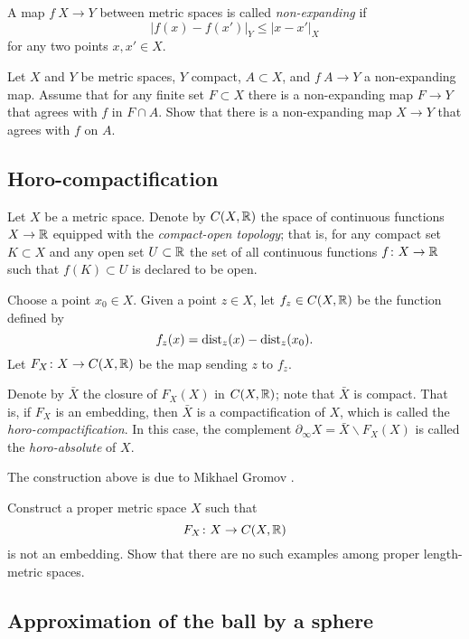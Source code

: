 A map $f\: X\to Y$ between metric spaces is called \emph{non-expanding} if
\[|f(x)-f(x')|_Y\le |x-x'|_X\]
for any two points $x,x'\in X$.

\begin{pr}
Let $X$ and $Y$ be metric spaces, 
$Y$ compact,
$A\subset X$,
and $f\:A\to Y$ a non-expanding map.
Assume that for any finite set $F\subset X$ there is a non-expanding map $F \to Y$
that agrees with $f$ in $F\cap A$.
Show that there is a non-expanding map $X\to  Y$ that agrees with $f$ on $A$.
\end{pr}


\subsection*{Horo-compactification\easy}
\label{Horocompactification}

Let $X$ be a metric space.
Denote by $C(X,\mathbb{R})$ the space of continuous functions $X\to \mathbb{R}$
equipped with the \emph{compact-open topology};
that is, for any compact set $K\subset X$ and any open set $U\subset \mathbb{R}$
the set of all continuous functions $f\colon X\to \mathbb{R}$ such that $f(K)\subset U$
is declared to be open.

Choose a point $x_0\in X$.
Given a point $z\in X$, let $f_z\in C(X,\mathbb{R})$ be the function defined by 
\[f_z(x)=\operatorname{\rm dist}\nolimits_z(x)-\operatorname{\rm dist}\nolimits_z(x_0).\]
Let $F_X\colon X\to C(X,\mathbb{R})$ be the map 
sending $z$ to $f_z$.

Denote by $\bar X$ 
the closure of $F_X(X)$ in $C(X,\mathbb{R})$;
note that $\bar X$ is compact.
That is, 
if $F_X$ is an embedding, 
then $\bar X$ is a compactification of $X$,
which is called the \emph{horo-compactification}.
In this case, the complement 
$\partial_\infty X=\bar X\backslash F_X(X)$ 
is called the {}\emph{horo-absolute} of $X$.

The construction above is due to Mikhael Gromov \cite{gromov-hyperbolic}.

\begin{pr}
Construct a proper metric space $X$
such that 
\[F_X\colon X\to C(X,\mathbb{R})\] 
is not an embedding.
Show that there are no such examples among proper length-metric spaces.
\end{pr}

\subsection*{Approximation of the ball by a sphere}
\label{3-sphere is close to a ball}


